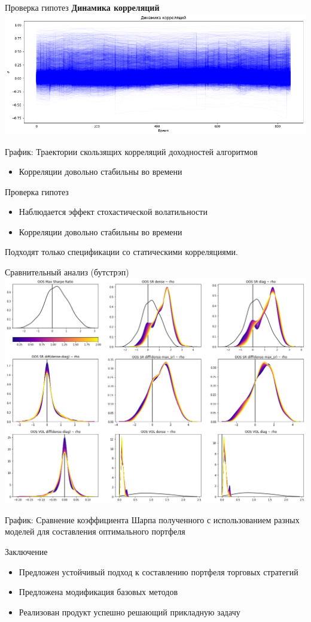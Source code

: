 \documentclass[14pt]{beamer}
\begin{document}
\begin{frame}{Проверка гипотез}
\textbf{Динамика корреляций}
\includegraphics[width=\linewidth]{correlations}

График: Траектории скользящих корреляций доходностей алгоритмов
\begin{itemize}
	\item Корреляции довольно стабильны во времени
\end{itemize}
\end{frame}
\begin{frame}{Проверка гипотез}
\begin{itemize}
	\item Наблюдается эффект стохастической волатильности
	\item Корреляции довольно стабильны во времени
\end{itemize}
Подходят только спецификации со статическими корреляциями.

\end{frame}
\begin{frame}{Сравнительный анализ (бутстрэп)}
\includegraphics[width=.7\linewidth]{performance}
	
График: Сравнение коэффициента Шарпа полученного с использованием разных моделей для составления оптимального портфеля
\end{frame}
\begin{frame}{Заключение}
\begin{itemize}
	\item Предложен устойчивый подход к составлению портфеля торговых стратегий
	\item Предложена модификация базовых методов
	\item Реализован продукт успешно решающий прикладную задачу
\end{itemize}
\end{frame}
\end{document}
